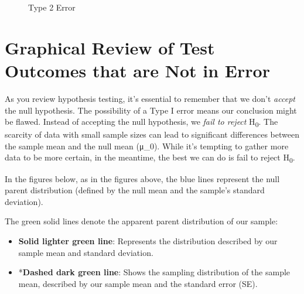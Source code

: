 \documentclass[
  letterpaper,
  DIV=11,
  numbers=noendperiod]{scrreprt}
\begin{document}
\begin{figure}


\caption{\label{fig-5-5.type2_error}Type 2 Error}

\end{figure}%

\section{Graphical Review of Test Outcomes that are Not in
Error}\label{graphical-review-of-test-outcomes-that-are-not-in-error}

As you review hypothesis testing, it's essential to remember that we
don't \emph{accept} the null hypothesis. The possibility of a Type I
error means our conclusion might be flawed. Instead of accepting the
null hypothesis, we \emph{fail to reject} H\textsubscript{0}. The
scarcity of data with small sample sizes can lead to significant
differences between the sample mean and the null mean (μ\_0). While it's
tempting to gather more data to be more certain, in the meantime, the
best we can do is fail to reject H\textsubscript{0}.

In the figures below, as in the figures above, the blue lines represent
the null parent distribution (defined by the null mean and the sample's
standard deviation).

The green solid lines denote the apparent parent distribution of our
sample:

\begin{itemize}
\item
  \textbf{Solid lighter green line}: Represents the distribution
  described by our sample mean and standard deviation.
\item
  *\textbf{Dashed dark green line}: Shows the sampling distribution of
  the sample mean, described by our sample mean and the standard error
  (SE).
\end{itemize}
\end{document}
